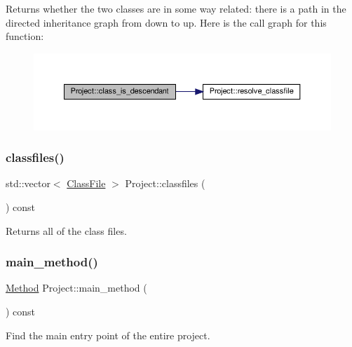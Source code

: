 Returns whether the two classes are in some way related\+: there is a path in the directed inheritance graph from down to up. Here is the call graph for this function\+:\nopagebreak
\begin{figure}[H]
\begin{center}
\leavevmode
\includegraphics[width=350pt]{classProject_a6ef93527bbe86e9bdfbc6d624eab0834_cgraph}
\end{center}
\end{figure}
\mbox{\label{classProject_a74b0dfe1d19f11e859489922a8d277c7}} 
\subsubsection{\texorpdfstring{classfiles()}{classfiles()}}
{\footnotesize\ttfamily std\+::vector$<$ \hyperlink{classfile_8h_a00b46b60bc40e813e9fb1bb049174346}{Class\+File} $>$ Project\+::classfiles (\begin{DoxyParamCaption}{ }\end{DoxyParamCaption}) const}



Returns all of the class files. 

\mbox{\label{classProject_a8122de9e7b4bc2a63e1391727c881474}} 
\subsubsection{\texorpdfstring{main\+\_\+method()}{main\_method()}}
{\footnotesize\ttfamily \hyperlink{classMethod}{Method} Project\+::main\+\_\+method (\begin{DoxyParamCaption}{ }\end{DoxyParamCaption}) const}



Find the main entry point of the entire project. 

